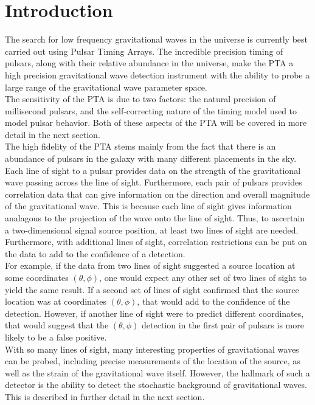 \documentclass[12pt]{article}
\begin{document}
\section{Introduction}
The search for low frequency gravitational waves in the universe is currently
best carried out using Pulsar Timing Arrays. The incredible precision timing of
pulsars, along with their relative abundance in the universe, make the PTA a
high precision gravitational wave detection instrument with the ability to probe
a large range of the gravitational wave parameter space.
\\
The sensitivity of the PTA is due to two factors: the natural precision of
millisecond pulsars, and the self-correcting nature of the timing model used to
model pulsar behavior. Both of these aspects of the PTA will be covered in more
detail in the next section.
\\
The high fidelity of the PTA stems mainly from the fact that there is an
abundance of pulsars in the galaxy with many different placements in the sky.
Each line of sight to a pulsar provides data on the strength of the
gravitational wave passing across the line of sight. Furthermore, each pair of
pulsars provides correlation data that can give information on the direction and
overall magnitude of the gravitational wave. This is because each line of sight
gives information analagous to the projection of the wave onto the line of
sight. Thus, to ascertain a two-dimensional signal source position, at least two
lines of sight are needed. Furthermore, with additional lines of sight,
correlation restrictions can be put on the data to add to the confidence of a
detection.
\\
For example, if the data from two lines of sight suggested a source location
at some coordinates $(\theta,\phi)$, one would expect any other set of two lines of
sight to yield the same result. If a second set of lines of sight confirmed that
the source location was at coordinates $(\theta,\phi)$, that would add to the
confidence of the detection. However, if another line of sight were to predict
different coordinates, that would suggest that the $(\theta, \phi)$ detection in
the first pair of pulsars is more likely to be a false positive.
\\
With so many lines of sight, many interesting properties of gravitational waves
can be probed, including precise measurements of the location of the source, as
well as the strain of the gravitational wave itself. However, the hallmark of
such a detector is the ability to detect the stochastic background of
gravitational waves. This is described in further detail in the next section.
\end{document}
